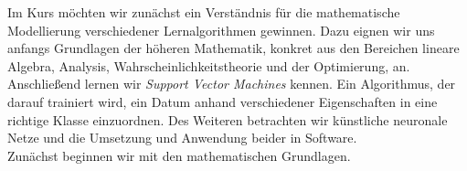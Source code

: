 Im Kurs möchten wir zunächst ein Verständnis für die mathematische Modellierung verschiedener Lernalgorithmen gewinnen. Dazu eignen wir uns anfangs Grundlagen der höheren Mathematik, konkret aus den Bereichen lineare Algebra, Analysis, Wahrscheinlichkeitstheorie und der Optimierung, an. Anschließend lernen wir \emph{Support Vector Machines} kennen. Ein Algorithmus, der darauf trainiert wird, ein Datum anhand verschiedener Eigenschaften in eine richtige Klasse einzuordnen. Des Weiteren betrachten wir künstliche neuronale Netze und die Umsetzung und Anwendung beider in Software.\\
Zunächst beginnen wir mit den mathematischen Grundlagen.